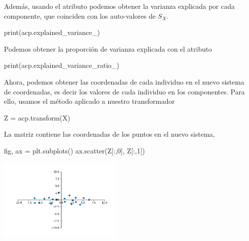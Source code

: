 \documentclass{beamer}
\begin{document}
\begin{frame}[fragile]
Además, usando el atributo  podemos obtener la varianza explicada por cada
componente, que coinciden con los auto-valores de $S_X$.

\begin{pyblock}
print(acp.explained_variance_)
\end{pyblock}
\begin{quote}
\printpythontex[verb]
\end{quote}
\begin{block}{}
  Podemos obtener la proporción de varianza explicada con el atributo 
\begin{pyblock}
print(acp.explained_variance_ratio_)
\end{pyblock}
\begin{quote}
\printpythontex[verb]
\end{quote}
  
\end{block}


\end{frame}
\begin{frame}[fragile]
Ahora, podemos obtener las coordenadas de cada individuo en el nuevo
sistema de coordenadas, es decir los valores de cada individuo en los
componentes. Para ello, usamos el método  aplicado a
nuestro transformador 

\begin{pyblock}
Z = acp.transform(X)
\end{pyblock}

La matriz  contiene las coordenadas de los puntos
en el nuevo sistema,
{\footnotesize
\begin{pyverbatim}
fig, ax = plt.subplots()
ax.scatter(Z[:,0], Z[:,1])
\end{pyverbatim}

\begin{center}
\includegraphics[width=6cm]{z1z2_matplotlib.png}
\end{center}
}
\end{frame}
\end{document}
